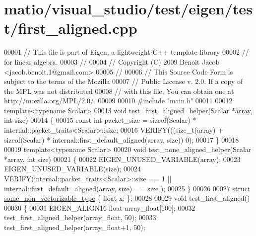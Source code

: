 \hypertarget{matio_2visual__studio_2test_2eigen_2test_2first__aligned_8cpp_source}{}\section{matio/visual\+\_\+studio/test/eigen/test/first\+\_\+aligned.cpp}
\label{matio_2visual__studio_2test_2eigen_2test_2first__aligned_8cpp_source}

\begin{DoxyCode}
00001 \textcolor{comment}{// This file is part of Eigen, a lightweight C++ template library}
00002 \textcolor{comment}{// for linear algebra.}
00003 \textcolor{comment}{//}
00004 \textcolor{comment}{// Copyright (C) 2009 Benoit Jacob <jacob.benoit.1@gmail.com>}
00005 \textcolor{comment}{//}
00006 \textcolor{comment}{// This Source Code Form is subject to the terms of the Mozilla}
00007 \textcolor{comment}{// Public License v. 2.0. If a copy of the MPL was not distributed}
00008 \textcolor{comment}{// with this file, You can obtain one at http://mozilla.org/MPL/2.0/.}
00009 
00010 \textcolor{preprocessor}{#include "main.h"}
00011 
00012 \textcolor{keyword}{template}<\textcolor{keyword}{typename} Scalar>
00013 \textcolor{keywordtype}{void} test\_first\_aligned\_helper(Scalar *\hyperlink{class_eigen_1_1array}{array}, \textcolor{keywordtype}{int} size)
00014 \{
00015   \textcolor{keyword}{const} \textcolor{keywordtype}{int} packet\_size = \textcolor{keyword}{sizeof}(Scalar) * internal::packet\_traits<Scalar>::size;
00016   VERIFY(((\textcolor{keywordtype}{size\_t}(array) + \textcolor{keyword}{sizeof}(Scalar) * internal::first\_default\_aligned(array, size)) %
       0);
00017 \}
00018 
00019 \textcolor{keyword}{template}<\textcolor{keyword}{typename} Scalar>
00020 \textcolor{keywordtype}{void} test\_none\_aligned\_helper(Scalar *array, \textcolor{keywordtype}{int} size)
00021 \{
00022   EIGEN\_UNUSED\_VARIABLE(array);
00023   EIGEN\_UNUSED\_VARIABLE(size);
00024   VERIFY(internal::packet\_traits<Scalar>::size == 1 || internal::first\_default\_aligned(array, size) == size
      );
00025 \}
00026 
00027 \textcolor{keyword}{struct }\hyperlink{structsome__non__vectorizable__type}{some\_non\_vectorizable\_type} \{ \textcolor{keywordtype}{float} x; \};
00028 
00029 \textcolor{keywordtype}{void} test\_first\_aligned()
00030 \{
00031   EIGEN\_ALIGN16 \textcolor{keywordtype}{float} array\_float[100];
00032   test\_first\_aligned\_helper(array\_float, 50);
00033   test\_first\_aligned\_helper(array\_float+1, 50);

\end{DoxyCode}
